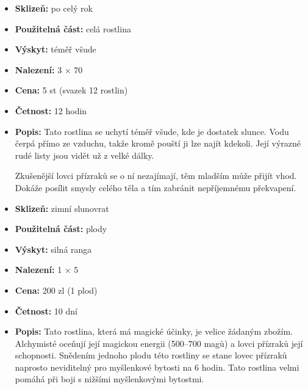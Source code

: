 \documentclass[../main.tex]{subfiles}
\begin{document}
\begin{predmet}[Siltavia]
\begin{itemize}
	\item \textbf{Sklizeň:} po celý rok
	\item \textbf{Použitelná část:} celá rostlina
	\item \textbf{Výskyt:} téměř všude
	\item \textbf{Nalezení:} 3 × 70
	\item \textbf{Cena:} 5 st (svazek 12 rostlin)
	\item \textbf{Četnost:} 12 hodin
	\item \textbf{Popis:} Tato rostlina se uchytí téměř všude, kde je dostatek slunce. Vodu čerpá přímo ze vzduchu, takže kromě pouští ji lze najít kdekoli. Její výrazné rudé listy jsou vidět už z velké dálky.

	Zkušenější lovci přízraků se o ní nezajímají, těm mladším může přijít vhod. Dokáže posílit smysly celého těla a tím zabránit nepříjemnému překvapení.
\end{itemize}
\end{predmet}

\begin{predmet}
\begin{itemize}
	\item \textbf{Sklizeň:} zimní slunovrat
	\item \textbf{Použitelná část:} plody
	\item \textbf{Výskyt:} silná ranga
	\item \textbf{Nalezení:} 1 × 5
	\item \textbf{Cena:} 200 zl (1 plod)
	\item \textbf{Četnost:} 10 dní
	\item \textbf{Popis:} Tato rostlina, která má magické účinky, je velice žádaným zbožím. Alchymisté oceňují její magickou energii (500–700 magů) a lovci přízraků její schopnosti. Snědením jednoho plodu této rostliny se stane lovec přízraků naprosto neviditelný pro myšlenkové bytosti na 6 hodin. Tato rostlina velmi pomáhá při boji s nižšími myšlenkovými bytostmi.
\end{itemize}
\end{predmet}
\end{document}
